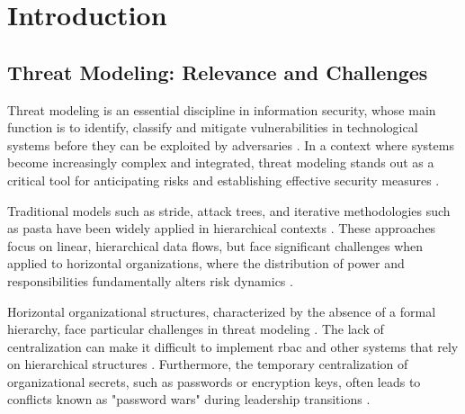 
%

%

\chapter{Introduction}
\label{cha:introduction}

\section{Threat Modeling: Relevance and Challenges}
\label{sec:threat_modeling_relevance_challenges}

Threat modeling is an essential discipline in information security, whose main
function is to identify, classify and mitigate vulnerabilities in technological
systems before they can be exploited by adversaries
\cite{ThreatModelingdesigningForSecurity,
ThreatModelingASystematicLiteratureReview}. In a context where systems become
increasingly complex and integrated, threat modeling stands out as a critical
tool for anticipating risks and establishing effective security measures
\cite{DemystifyingTheThreatModelingProcess,
ThreatModelingASummaryOfAvailableMethods}.

Traditional models such as \gls{stride}, attack trees, and iterative
methodologies such as \gls{pasta} have been widely applied in hierarchical contexts
\cite{MicrosoftThreatModelingTechnique, AttackTrees, RiskCentricThreatModeling}.
These approaches focus on linear, hierarchical data flows, but face
significant challenges when applied to horizontal organizations, where the
distribution of power and responsibilities fundamentally alters risk dynamics
\cite{EvaluationofCompetingThreatModeling, Colbac}.

Horizontal organizational structures, characterized by the absence of a formal
hierarchy, face particular challenges in threat modeling \cite{Colbac}. The lack of
centralization can make it difficult to implement \gls{rbac} and other
systems that rely on hierarchical structures \cite{Colbac}. Furthermore, the
temporary centralization of organizational secrets, such as passwords or
encryption keys, often leads to conflicts known as "password wars" during
leadership transitions \cite{FromCounterpublicstoContentious}.

